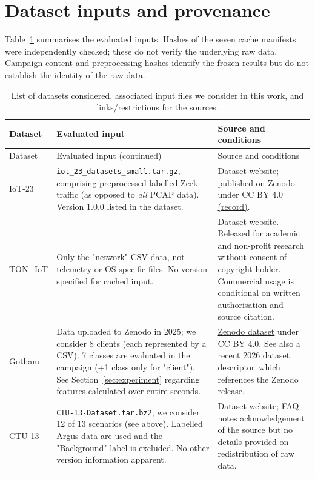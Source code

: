 \section{Dataset inputs and provenance} 
\label{app:data} 
\setcounter{table}{0} 
Table~\ref{tab:dataset-inputs} summarises the evaluated inputs. Hashes of the seven cache manifests were independently checked; these do not verify the underlying raw data. Campaign content and preprocessing hashes identify the frozen results but do not establish the identity of the raw data.

{\small 
\begin{longtable}{>{\raggedright\arraybackslash}p{}>{\raggedright\arraybackslash}p{}>{\raggedright\arraybackslash}p{}} 
\caption{List of datasets considered, associated input files we consider in this work, and links/restrictions for the sources.}\label{tab:dataset-inputs}\\
\toprule Dataset & Evaluated input & Source and conditions\\\midrule\endfirsthead
\toprule Dataset & Evaluated input (continued) & Source and conditions\\\midrule\endhead
\bottomrule\endfoot 
IoT-23 & \texttt{iot\_23\_datasets\_small.tar.gz}, comprising preprocessed labelled Zeek traffic (as opposed to \textit{all} PCAP data). Version 1.0.0 listed in the dataset. & \href{https://www.stratosphereips.org/datasets-iot23}{Dataset website}; published on Zenodo under CC BY 4.0 \href{https://doi.org/10.5281/zenodo.4743746}{(record)}.\\
TON\_IoT & Only the "network" CSV data, not telemetry or OS-specific files. No version specified for cached input. & \href{https://research.unsw.edu.au/projects/toniot-datasets}{Dataset website}. Released for academic and non-profit research without consent of copyright holder. Commercial usage is conditional on written authorisation and source citation.\\
Gotham & Data uploaded to Zenodo in 2025; we consider 8 clients (each represented by a CSV). 7 classes are evaluated in the campaign (+1 class only for "client"). See Section~\ref{sec:experiment} regarding features calculated over entire seconds. & \href{https://doi.org/10.5281/zenodo.14502760}{Zenodo dataset} under CC BY 4.0. See also a recent 2026 dataset descriptor\,\cite{belarbi2026descriptor} which references the Zenodo release.\\
CTU-13 & \texttt{CTU-13-Dataset.tar.bz2}; we consider 12 of 13 scenarios (see above). Labelled Argus data are used and the "Background" label is excluded. No other version information apparent. & \href{https://www.stratosphereips.org/datasets-ctu13}{Dataset website}; \href{https://www.stratosphereips.org/datasets-faq}{FAQ} notes acknowledgement of the source but no details provided on redistribution of raw data.\\

\end{longtable}}
